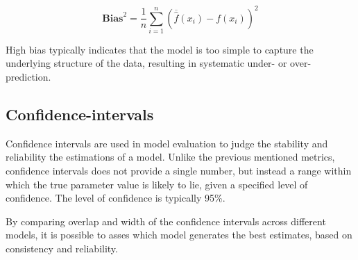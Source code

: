 $$
\textbf{Bias}^2 = \frac{1}{n} \sum_{i=1}^{n} (\overline{\hat{f}}(x_i) - f(x_i))^2
$$

High bias typically indicates that the model is too simple to capture the underlying structure of the data, resulting in systematic under- or over-prediction.



\subsection{Confidence-intervals}
Confidence intervals are used in model evaluation to judge the stability and reliability the estimations of a model. Unlike the previous mentioned metrics, confidence intervals does not provide a single number, but instead a range within which the true parameter value is likely to lie, given a specified level of confidence. The level of confidence is typically 95\%.

By comparing overlap and width of the confidence intervals across different models, it is possible to asses which model generates the best estimates, based on consistency and reliability.
